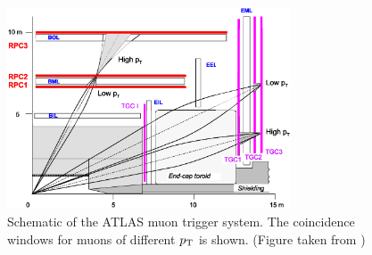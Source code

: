 \begin{figure}[h!]
\centering
\includegraphics[width=0.75\textwidth, angle=0]{figures/LHC_ATLAS/RPC_TGC_schematics_5.eps}
\caption{ Schematic of the ATLAS muon trigger system.  The coincidence windows for muons of different $p_{\mathrm{T}}$ is shown. (Figure taken from \cite{ATLAS_JINST}) \label{LHC:fig:MS_trigger}}
\end{figure}
